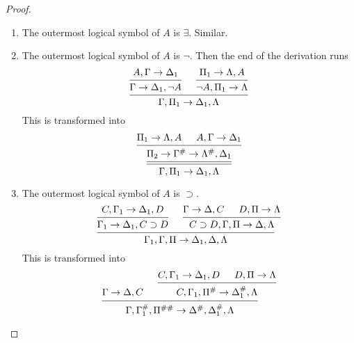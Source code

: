 \documentclass[11pt]{article}
\begin{document}
\begin{proof}
\begin{enumerate}
\begin{enumerate}
\begin{enumerate}
(\(a\) being fully indicated in \(F(a)\)). By the eigenvariable
condition, \(a\) does not occur in \(\Gamma,\Delta_1\) or \(F(x)\). Since
by assumption the proof ending with \(\Gamma\to\Delta_1, F(a)\)
contains no mix, we can obtain a proof without a mix, ending with
\(\Gamma\to\Delta_1,F(t)\). Consider now 
\begin{equation*}
\begin{prooftree}%
\hypo{\Gamma\to\Delta_1,F(t)}
\hypo{F(t),\Pi_1\to\Lambda}
\infer2[\((F(t))\)]{\Gamma,\Pi_1^\#\to\Delta_1^\#,\Lambda}
\end{prooftree}
\end{equation*}
\item The outermost logical symbol of \(A\) is \(\exists\). Similar.
\item The outermost logical symbol of \(A\) is \(\neg\).
Then the end of the derivation runs
\begin{equation*}
\begin{prooftree}%
\hypo{A,\Gamma\to\Delta_1}
\infer1{\Gamma\to\Delta_1,\neg A}
\hypo{\Pi_1\to\Lambda,A}
\infer1{\neg A,\Pi_1\to\Lambda}
\infer2{\Gamma,\Pi_1\to\Delta_1,\Lambda}
\end{prooftree}
\end{equation*}
This is transformed into
\begin{equation*}
\begin{prooftree}%
\hypo{\Pi_1\to\Lambda,A}
\hypo{A,\Gamma \to\Delta_1}
\infer2{\Pi_2\to\Gamma^\#\to\Lambda^\#,\Delta_1}
\infer[double]1{\Gamma,\Pi_1\to\Delta_1,\Lambda}
\end{prooftree}
\end{equation*}
\item The outermost logical symbol of \(A\) is \(\supset\).
\begin{equation*}
\begin{prooftree}%
\hypo{C,\Gamma_1\to\Delta_1,D}
\infer1{\Gamma_1\to\Delta_1,C\supset D}
\hypo{\Gamma\to\Delta,C}
\hypo{D,\Pi\to\Lambda}
\infer2{C\supset D,\Gamma,\Pi\to\Delta,\Lambda}
\infer2{\Gamma_1,\Gamma,\Pi \to\Delta_1,\Delta,\Lambda}
\end{prooftree}
\end{equation*}
This is transformed into
\begin{equation*}
\begin{prooftree}%
\hypo{\Gamma\to\Delta,C}
\hypo{C,\Gamma_1\to\Delta_1,D}
\hypo{D,\Pi\to\Lambda}
\infer2{C,\Gamma_1,\Pi^\#\to\Delta_1^\#,\Lambda}
\infer2{\Gamma,\Gamma_1^\#,\Pi^{\#\#}\to\Delta^\#,\Delta_1^\#,\Lambda}

\end{prooftree}
\end{equation*}
\end{enumerate}
\end{enumerate}
\end{enumerate}
\end{proof}
\end{document}
